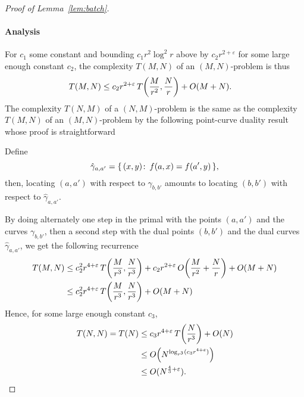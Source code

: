 \begin{proof}[Proof of Lemma~\ref{lem:batch}]
\paragraph{Analysis} For $c_1$ some constant and bounding $c_1 r^{2} \log^2 r$
above by $c_2 r^{2+\varepsilon}$ for some large enough constant $c_2$, the
complexity $T(M,N)$ of an $(M,N)$-problem is thus
\begin{align*}
    T(M,N) &\le c_2 r^{2+\varepsilon}\,T\mleft(\frac{M}{r^{2}},\frac{N}{r}\mright) + O(M+N).
\end{align*}
The complexity $T(N,M)$ of a \((N,M)\)-problem is the same as the
complexity $T(M,N)$ of an \((M,N)\)-problem by the following point-curve
duality result whose proof is straightforward
\begin{lemma}\label{lem:dual}
Define
\begin{displaymath}
    \hat{\gamma}_{a,a'} = \{\, (x,y) \colon\, f(a,x)=f(a',y)\,\},
\end{displaymath}
then, locating $(a,a')$ with respect to $\gamma_{b,b'}$ amounts to
locating $(b,b')$ with respect to $\hat{\gamma}_{a,a'}$.
\end{lemma}

By doing alternately one step in the primal with the points $(a,a')$ and the
curves $\gamma_{b,b'}$, then a second step with the dual points $(b,b')$ and the
dual curves $\hat{\gamma}_{a,a'}$, we get the following recurrence
\begin{align*}
    T(M,N) &\le c_2^2 r^{4+\varepsilon}\,T\mleft(\frac{M}{r^{3}},\frac{N}{r^{3}}\mright) +
	c_2 r^{2+\varepsilon}\,O\mleft(\frac{M}{r^2} + \frac{N}{r}\mright) +
	O(M+N)\\
	&\le c_2^2 r^{4+\varepsilon}\,T\mleft(\frac{M}{r^{3}},\frac{N}{r^{3}}\mright) +
	O(M+N)
\end{align*}
Hence, for some large enough constant $c_3$,
\begin{align*}
T(N,N) = T(N) &\le c_3 r^{4+\varepsilon}\,T\mleft(\frac{N}{r^{3}}\mright) + O(N)\\
	      &\le O\mleft(N^{\log_{r^{3}} (c_3  r^{4+\varepsilon})}\mright)\\
	&\le O(N^{\frac 43 + \varepsilon}).
\end{align*}
\end{proof}



